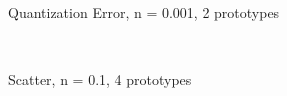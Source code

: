 \documentclass[10pt,a4paper]{article}
\begin{document}
\begin{figure}
  \centering
{} \\
  \caption{Quantization Error, n = 0.001, 2 prototypes}
  \label{fig:n0001_k2_learning}
\end{figure}

\begin{figure}
  \centering
{} \\
  \caption{Scatter, n = 0.1, 4 prototypes}
  \label{fig:n01_k4}
\end{figure}
\end{document}
